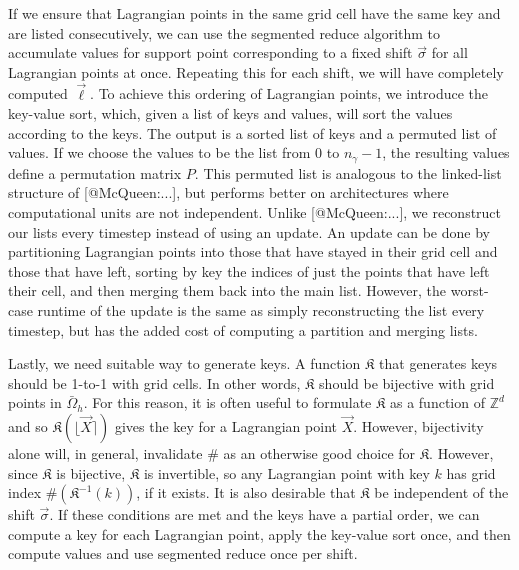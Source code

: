 If we ensure that Lagrangian points in the same grid cell have the same key
and are listed consecutively, we can use the segmented reduce algorithm to
accumulate values for support point corresponding to a fixed shift
$\vec{\sigma}$ for all Lagrangian points at once. Repeating this for each
shift, we will have completely computed $\vec{\ell}$. To achieve this ordering
of Lagrangian points, we introduce the key-value sort, which, given a list
of keys and values, will sort the values according to the keys. The output is
a sorted list of keys and a permuted list of values. If we choose the values to
be the list from 0 to $n_\gamma-1$, the resulting values define a permutation
matrix $P$. This permuted list is analogous to the linked-list structure of
[@McQueen:...], but performs better on architectures where computational units
are not independent. Unlike [@McQueen:...], we reconstruct our lists every
timestep instead of using an update. An update can be done by partitioning
Lagrangian points into those that have stayed in their grid cell and those that
have left, sorting by key the indices of just the points that have left their
cell, and then merging them back into the main list. However, the worst-case
runtime of the update is the same as simply reconstructing the list every
timestep, but has the added cost of computing a partition and merging lists.

Lastly, we need suitable way to generate keys. A function $\mathfrak{K}$ that
generates keys should be 1-to-1 with grid cells. In other words, $\mathfrak{K}$
should be bijective with grid points in $\bar{\Omega}_h$. For this reason, it
is often useful to formulate $\mathfrak{K}$ as a function of $\mathbb{Z}^d$ and
so $\mathfrak{K}(\lfloor\vec{X}\rceil)$ gives the key for a Lagrangian point
$\vec{X}$. However, bijectivity alone will, in general, invalidate $\#$ as an
otherwise good choice for $\mathfrak{K}$. However, since $\mathfrak{K}$ is
bijective, $\mathfrak{K}$ is invertible, so any Lagrangian point with key $k$
has grid index $\#(\mathfrak{K}^{-1}(k))$, if it exists. It is also desirable
that $\mathfrak{K}$ be independent of the shift $\vec{\sigma}$. If these
conditions are met and the keys have a partial order, we can compute a key for
each Lagrangian point, apply the key-value sort once, and then compute values
and use segmented reduce once per shift.

